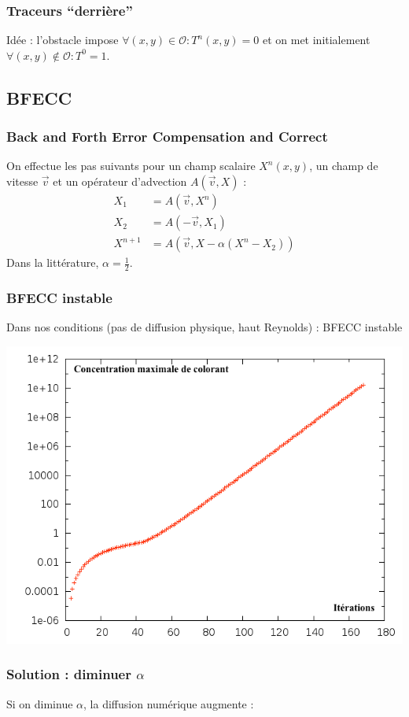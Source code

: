 \documentclass{beamer}
\renewcommand\O{\mathcal{O}}
\begin{document}
  \begin{frame}
    \frametitle{Traceurs ``derrière''}
    Idée : l'obstacle impose $\forall (x,y) \in \O: T^n(x,y) = 0$ et on met
    initialement  $\forall (x,y) \not\in \O : T^0 = 1$.
    \begin{center}
    \end{center}
  \end{frame}
  \subsection{BFECC}
  \begin{frame}
    \frametitle{Back and Forth Error Compensation and Correct }
    On effectue les pas suivants pour un champ scalaire $X^n(x,y)$, un
    champ de vitesse $\vec{v}$ et un opérateur d'advection
    $A(\vec{v},X)$ :
    \begin{align}
      X_1 & = A(\vec{v},X^n) \\
      X_2 & = A(-\vec{v},X_1) \\
      X^{n+1} & = A(\vec{v},X - \alpha(X^n - X_2))
    \end{align}
    Dans la littérature, $\alpha = \frac{1}{2}$.
  \end{frame}

  \begin{frame}
    \frametitle{BFECC instable}
    Dans nos conditions (pas de diffusion physique, haut Reynolds)
    : BFECC instable
    \begin{center}
      \includegraphics[height=0.8\textheight]{instab_BFECC.png}
    \end{center}
  \end{frame}
  \begin{frame}
    \frametitle{Solution : diminuer $\alpha$}
    Si on diminue $\alpha$, la diffusion numérique augmente :
  \end{frame}
  
\end{document}
